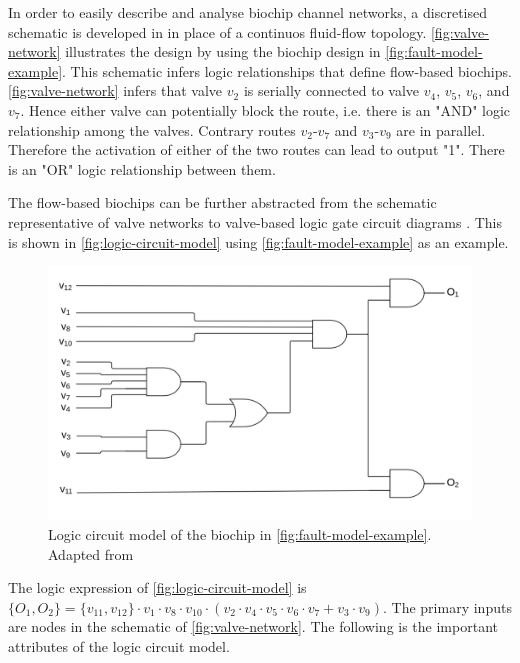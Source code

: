 In order to easily describe and analyse biochip channel networks, a discretised schematic is developed in \cite{fault-modeling} in place of a continuos fluid-flow topology. \autoref{fig:valve-network} illustrates the design by using the biochip design in \autoref{fig:fault-model-example}. This schematic infers logic relationships that define flow-based biochips. \autoref{fig:valve-network} infers that valve $v_2$ is serially connected to valve $v_4$, $v_5$, $v_6$, and $v_7$. Hence either valve can potentially block the route, i.e. there is an "AND" logic relationship among the valves. Contrary routes $v_2$-$v_7$ and $v_3$-$v_9$ are in parallel. Therefore the activation of either of the two routes can lead to output "1". There is an "OR" logic relationship between them.

The flow-based biochips can be further abstracted from the schematic representative of valve networks to valve-based logic gate circuit diagrams \cite{fault-modeling}. This is shown in \autoref{fig:logic-circuit-model} using \autoref{fig:fault-model-example} as an example.

\begin{figure}
\centering
\includegraphics[scale=0.55]{figures/logic-circuit-model.png}
\caption[Logic circuit model of the biochip in \autoref{fig:fault-model-example}. Adapted from \cite{fault-modeling}]{Logic circuit model of the biochip in \autoref{fig:fault-model-example}. Adapted from \cite{fault-modeling}}
\label{fig:logic-circuit-model}
\end{figure}

The logic expression of \autoref{fig:logic-circuit-model} is $\{O_1, O_2\} = \{v_{11}, v_{12}\} \cdot v_1 \cdot v_8 \cdot v_{10} \cdot (v_2 \cdot v_4 \cdot v_5 \cdot v_6 \cdot v_7 + v_3 \cdot v_9)$. The primary inputs are nodes in the schematic of \autoref{fig:valve-network}. The following is the important attributes of the logic circuit model.


